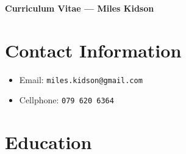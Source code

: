 \documentclass[11pt]{article}
\numberwithin{equation}{section}
\numberwithin{figure}{section}
\numberwithin{table}{section}
\begin{document}
\begin{center}
    {\Large \textbf{Curriculum Vitae --- Miles Kidson}}

\end{center}

\section*{Contact Information}
\begin{itemize}
    \item Email: \texttt{miles.kidson@gmail.com}
    \item Cellphone: \texttt{079 620 6364}
\end{itemize}

\section*{Education}
\end{document}
